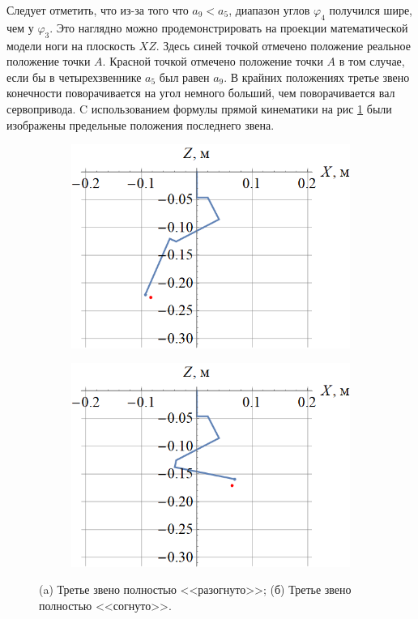Следует отметить, что из-за того что $ a_9 < a_5 $, диапазон углов $ \varphi_4 $ получился шире, чем у $ \varphi_3 $. Это наглядно можно продемонстрировать на проекции математической модели ноги на плоскость $ XZ $. Здесь синей точкой отмечено положение реальное положение точки $ A $. Красной точкой отмечено положение точки $ A $ в том случае, если бы в четырехзвеннике $ a_5 $ был равен $ a_9 $. В крайних положениях третье звено конечности поворачивается на угол немного больший, чем поворачивается вал сервопривода. C использованием формулы прямой кинематики на рис \ref{fig:leg_model} были изображены предельные положения последнего звена.
\begin{figure}[ht]
    \centering
    \begin{subfigure}[b]{0.45\textwidth}    
        \centering
        \includegraphics[scale=0.4]{chapter_kinematics/figure5.png}
        \caption{}
    \end{subfigure}
    \begin{subfigure}[b]{0.45\textwidth}
        \centering
        \includegraphics[scale=0.4]{chapter_kinematics/figure6.png}
        \caption{}
    \end{subfigure}
     
    \caption{(a) Третье звено полностью <<разогнуто>>; (б) Третье звено полностью <<согнуто>>.}
    \label{fig:leg_model}
\end{figure} %


